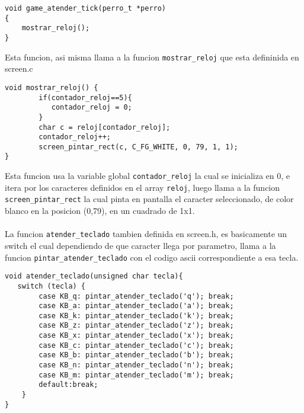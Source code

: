 \begin{codesnippet}
\begin{verbatim}
void game_atender_tick(perro_t *perro)
{
    mostrar_reloj();
}
\end{verbatim}
\end{codesnippet}

\noindent Esta funcion, asi misma llama a la funcion \texttt{mostrar\_reloj} que esta defininida en screen.c

\begin{codesnippet}
\begin{verbatim}
void mostrar_reloj() {
        if(contador_reloj==5){
           contador_reloj = 0;
        }
        char c = reloj[contador_reloj];
        contador_reloj++;
        screen_pintar_rect(c, C_FG_WHITE, 0, 79, 1, 1);
}
\end{verbatim}
\end{codesnippet}

\noindent Esta funcion usa la variable global \texttt{contador\_reloj} la cual se inicializa en 0, e itera por los caracteres definidos en el array \texttt{reloj}, luego llama a la funcion \texttt{screen\_pintar\_rect} la cual pinta en pantalla el caracter seleccionado, de color blanco en la posicion (0,79), en un cuadrado de 1x1.
\\
\\
La funcion \texttt{atender\_teclado} tambien definida en screen.h, es basicamente un switch el cual dependiendo de que caracter llega por parametro, llama a la funcion \texttt{pintar\_atender\_teclado} con el codigo ascii correspondiente a esa tecla.

\begin{codesnippet}
\begin{verbatim}
void atender_teclado(unsigned char tecla){
   switch (tecla) {
        case KB_q: pintar_atender_teclado('q'); break;
        case KB_a: pintar_atender_teclado('a'); break;
        case KB_k: pintar_atender_teclado('k'); break;
        case KB_z: pintar_atender_teclado('z'); break;
        case KB_x: pintar_atender_teclado('x'); break;
        case KB_c: pintar_atender_teclado('c'); break;
        case KB_b: pintar_atender_teclado('b'); break;
        case KB_n: pintar_atender_teclado('n'); break;
        case KB_m: pintar_atender_teclado('m'); break;
        default:break;
    }
}

\end{verbatim}
\end{codesnippet}
